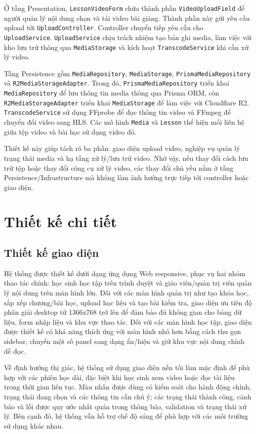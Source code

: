 \documentclass[../DoAn.tex]{subfiles}
\begin{document}
Ở tầng Presentation, \texttt{LessonVideoForm} chứa thành phần \texttt{VideoUploadField} để người quản lý nội dung chọn và tải video bài giảng. Thành phần này gửi yêu cầu upload tới \texttt{UploadController}. Controller chuyển tiếp yêu cầu cho \texttt{UploadService}. \texttt{UploadService} chịu trách nhiệm tạo bản ghi media, làm việc với kho lưu trữ thông qua \texttt{MediaStorage} và kích hoạt \texttt{TranscodeService} khi cần xử lý video.

Tầng Persistence gồm \texttt{MediaRepository}, \texttt{MediaStorage}, \texttt{PrismaMediaRepository} và \texttt{R2MediaStorageAdapter}. Trong đó, \texttt{PrismaMediaRepository} triển khai \texttt{MediaRepository} để lưu thông tin media thông qua Prisma ORM, còn \texttt{R2MediaStorageAdapter} triển khai \texttt{MediaStorage} để làm việc với Cloudflare R2. \texttt{TranscodeService} sử dụng FFprobe để đọc thông tin video và FFmpeg để chuyển đổi video sang HLS. Các mô hình \texttt{Media} và \texttt{Lesson} thể hiện mối liên hệ giữa tệp video và bài học sử dụng video đó.

Thiết kế này giúp tách rõ ba phần: giao diện upload video, nghiệp vụ quản lý trạng thái media và hạ tầng xử lý/lưu trữ video. Nhờ vậy, nếu thay đổi cách lưu trữ tệp hoặc thay đổi công cụ xử lý video, các thay đổi chủ yếu nằm ở tầng Persistence/Infrastructure mà không làm ảnh hưởng trực tiếp tới controller hoặc giao diện.

\section{Thiết kế chi tiết}
\subsection{Thiết kế giao diện}
Hệ thống được thiết kế dưới dạng ứng dụng Web responsive, phục vụ hai nhóm thao tác chính: học sinh học tập trên trình duyệt và giáo viên/quản trị viên quản lý nội dung trên màn hình lớn. Đối với các màn hình quản trị như tạo khóa học, sắp xếp chương/bài học, upload học liệu và tạo bài kiểm tra, giao diện ưu tiên độ phân giải desktop từ 1366x768 trở lên để đảm bảo đủ không gian cho bảng dữ liệu, form nhập liệu và khu vực thao tác. Đối với các màn hình học tập, giao diện được thiết kế có khả năng thích ứng với màn hình nhỏ hơn bằng cách thu gọn sidebar, chuyển một số panel sang dạng ẩn/hiện và giữ khu vực nội dung chính dễ đọc.

Về định hướng thị giác, hệ thống sử dụng giao diện nền tối làm mặc định để phù hợp với các phiên học dài, đặc biệt khi học sinh xem video hoặc đọc tài liệu trong thời gian liên tục. Màu nhấn được dùng có kiểm soát cho hành động chính, trạng thái đang chọn và các thông tin cần chú ý; các trạng thái thành công, cảnh báo và lỗi được quy ước nhất quán trong thông báo, validation và trạng thái xử lý. Bên cạnh đó, hệ thống vẫn hỗ trợ chế độ sáng để phù hợp với các môi trường sử dụng khác nhau.
\end{document}
